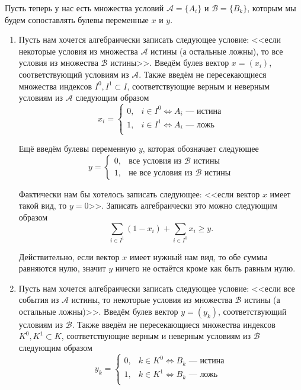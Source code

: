 \label{fact:complex_conditions}

Пусть теперь у нас есть множества условий $\mathcal{A} = \{A_i\}$ и $\mathcal{B} = \{B_k\}$, которым мы будем сопоставлять булевы переменные $x$ и $y$.

\begin{enumerate}[nosep]
	\item Пусть нам хочется алгебраически записать следующее условие: <<если некоторые условия из множества $\mathcal{A}$ истины (а остальные ложны), то все условия из множества $\mathcal{B}$ истины>>. Введём булев вектор $x = (x_i)$, соответствующий условиям из $\mathcal{A}$. Также введём не пересекающиеся множества индексов $I^0, I^1 \subset I$, соответствующие верным и неверным условиям из $\mathcal{A}$ следующим образом
	\[
	x_i = \begin{cases}
		0,& i \in I^0 \Leftrightarrow \text{$A_i$ --- истина}\\
		1,& i \in I^1 \Leftrightarrow \text{$A_i$ --- ложь}\\
	\end{cases}
	\]
	
	Ещё введём булевы переменную $y$, которая обозначает следующее
	\[
	y = \begin{cases}
		0, &\text{все условия из $\mathcal{B}$ истины} \\
		1, &\text{не все условия из $\mathcal{B}$ истины}
	\end{cases}
	\]
	
	Фактически нам бы хотелось записать следующее: <<если вектор $x$ имеет такой вид, то $y = 0$>>. Записать алгебраически это можно следующим образом
	\[
	\sum_{i \in I^1}(1-x_i) + \sum_{i \in I^0}x_i \ge y.
	\]
	
	Действительно, если вектор $x$ имеет нужный нам вид, то обе суммы равняются нулю, значит $y$ ничего не остаётся кроме как быть равным нулю.
	
	\item  Пусть нам хочется алгебраически записать следующее условие: <<если все события из $\mathcal{A}$ истины, то некоторые условия из множества $\mathcal{B}$ истины (а остальные ложны)>>. Введём булев вектор $y = (y_k)$, соответствующий условиям из $\mathcal{B}$. Также введём не пересекающиеся множества индексов $K^0, K^1 \subset K$, соответствующие верным и неверным условиям из $\mathcal{B}$ следующим образом
	\[
	y_k = \begin{cases}
		0,& k \in K^0 \Leftrightarrow \text{$B_k$ --- истина}\\
		1,& k \in K^1 \Leftrightarrow \text{$B_k$ --- ложь}\\
	\end{cases}
	\]
	

\end{enumerate}
